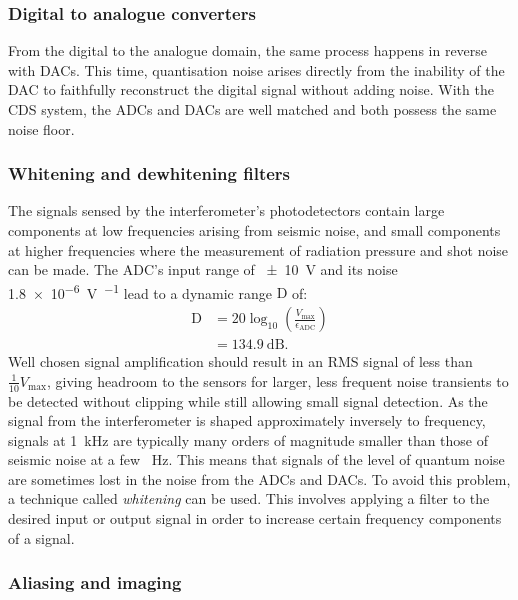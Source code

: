 \subsubsection{Digital to analogue converters}
From the digital to the analogue domain, the same process happens in reverse with \glspl{DAC}. This time, quantisation noise arises directly from the inability of the \gls{DAC} to faithfully reconstruct the digital signal without adding noise. With the \gls{CDS} system, the \glspl{ADC} and \glspl{DAC} are well matched and both possess the same noise floor.

\subsubsection{Whitening and dewhitening filters}
The signals sensed by the interferometer's photodetectors contain large components at low frequencies arising from seismic noise, and small components at higher frequencies where the measurement of radiation pressure and shot noise can be made. The \gls{ADC}'s input range of \SI{\pm10}{\volt} and its noise \SI{1.8e-6}{\volt\per\sqrthz} lead to a dynamic range $\text{D}$ of:
\begin{equation}
  \begin{split}
    \text{D} &= 20 \log_{10} \left( \frac{V_{\text{max}}}{\epsilon_{\text{ADC}}} \right) \\
             &= \SI{134.9}{\deci\bel}.
  \end{split}
\end{equation}
Well chosen signal amplification should result in an \gls{RMS} signal of less than $\frac{1}{10} V_{\text{max}}$, giving headroom to the sensors for larger, less frequent noise transients to be detected without clipping while still allowing small signal detection. As the signal from the interferometer is shaped approximately inversely to frequency, signals at \SI{1}{\kilo\hertz} are typically many orders of magnitude smaller than those of seismic noise at a few \SI{}{\hertz}. This means that signals of the level of quantum noise are sometimes lost in the noise from the \glspl{ADC} and \glspl{DAC}. To avoid this problem, a technique called \emph{whitening} can be used. This involves applying a filter to the desired input or output signal in order to increase certain frequency components of a signal.


\subsubsection{Aliasing and imaging}

